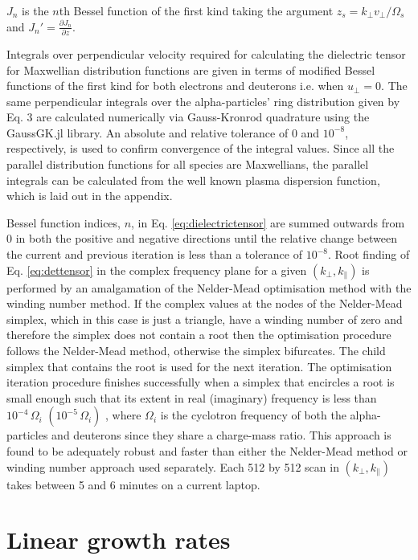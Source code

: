 \documentclass[12pt]{iopart}
\begin{document}
\noindent $J_n$ is the $n$th Bessel function of the first kind taking the
argument $z_s=k_\perp v_\perp / \Omega_s$ and $J_n'=\frac{\partial J_n}{\partial z}$.

Integrals over perpendicular velocity required for calculating the
dielectric tensor for Maxwellian distribution functions are given in terms of
modified Bessel functions of the first kind\cite{Stix} for both electrons and
deuterons i.e. when $u_\perp =0$. The same perpendicular integrals over the
alpha-particles' ring distribution given by Eq. 3 are calculated numerically via
Gauss-Kronrod\cite{Kronrod1965} quadrature using the GaussGK.jl\cite{QuadGK}
library. An absolute and relative tolerance of $0$ and $10^{-8}$, respectively,
is used to confirm convergence of the integral values.
Since all the parallel distribution functions for all species are Maxwellians,
the parallel integrals can be calculated from the well known plasma dispersion
function\cite{Fried1961}, which is laid out in the appendix.

Bessel function indices, $n$, in Eq. \ref{eq:dielectrictensor} are summed outwards
from 0 in both the positive and negative directions
until the relative change between the current and
previous iteration is less than a tolerance of $10^{-8}$. 
Root finding of Eq. \ref{eq:dettensor} in the complex frequency plane
for a given $(k_\bot, k_\parallel)$ is performed by an amalgamation of the
Nelder-Mead\cite{Nelder1965} optimisation method with the winding number method.
If the complex values at the nodes of the Nelder-Mead simplex, which in this
case is just a triangle, have a winding number
of zero and therefore the simplex does not contain a root then the optimisation
procedure follows the Nelder-Mead method, otherwise the simplex bifurcates.
The child simplex that contains the root is used for the next
iteration. The optimisation iteration procedure finishes successfully when
a simplex that encircles a root is small enough such that its extent in real
(imaginary) frequency is less than $10^{-4}\, \Omega_i$ $(10^{-5}\, \Omega_i)$
, where $\Omega_i$ is the cyclotron frequency of both
the alpha-particles and deuterons since they share a charge-mass ratio.
This approach is found to be adequately robust and
faster than either the Nelder-Mead method or winding number approach used
separately. Each 512 by 512 scan in $(k_\perp, k_\parallel)$ takes between 5
and 6 minutes on a current laptop.

\section{Linear growth rates}
\end{document}
